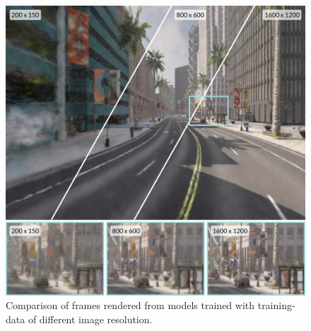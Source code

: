 \begin{figure}[ht]
    \centering
    \includegraphics[width=1.0\textwidth]{figures/image-size-comparison-details.png}
    \caption{Comparison of frames rendered from models trained with training-data of different image resolution.}
    \label{fig:image-size-comparison}
\end{figure}